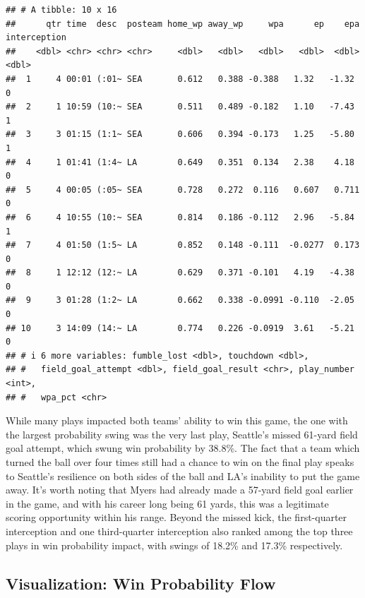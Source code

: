 \documentclass[
]{article}
\begin{document}
\begin{verbatim}
## # A tibble: 10 x 16
##      qtr time  desc  posteam home_wp away_wp     wpa      ep    epa interception
##    <dbl> <chr> <chr> <chr>     <dbl>   <dbl>   <dbl>   <dbl>  <dbl>        <dbl>
##  1     4 00:01 (:01~ SEA       0.612   0.388 -0.388   1.32   -1.32             0
##  2     1 10:59 (10:~ SEA       0.511   0.489 -0.182   1.10   -7.43             1
##  3     3 01:15 (1:1~ SEA       0.606   0.394 -0.173   1.25   -5.80             1
##  4     1 01:41 (1:4~ LA        0.649   0.351  0.134   2.38    4.18             0
##  5     4 00:05 (:05~ SEA       0.728   0.272  0.116   0.607   0.711            0
##  6     4 10:55 (10:~ SEA       0.814   0.186 -0.112   2.96   -5.84             1
##  7     4 01:50 (1:5~ LA        0.852   0.148 -0.111  -0.0277  0.173            0
##  8     1 12:12 (12:~ LA        0.629   0.371 -0.101   4.19   -4.38             0
##  9     3 01:28 (1:2~ LA        0.662   0.338 -0.0991 -0.110  -2.05             0
## 10     3 14:09 (14:~ LA        0.774   0.226 -0.0919  3.61   -5.21             0
## # i 6 more variables: fumble_lost <dbl>, touchdown <dbl>,
## #   field_goal_attempt <dbl>, field_goal_result <chr>, play_number <int>,
## #   wpa_pct <chr>
\end{verbatim}

While many plays impacted both teams' ability to win this game, the one
with the largest probability swing was the very last play, Seattle's
missed 61-yard field goal attempt, which swung win probability by
38.8\%. The fact that a team which turned the ball over four times still
had a chance to win on the final play speaks to Seattle's resilience on
both sides of the ball and LA's inability to put the game away. It's
worth noting that Myers had already made a 57-yard field goal earlier in
the game, and with his career long being 61 yards, this was a legitimate
scoring opportunity within his range. Beyond the missed kick, the
first-quarter interception and one third-quarter interception also
ranked among the top three plays in win probability impact, with swings
of 18.2\% and 17.3\% respectively.

\subsection{Visualization: Win Probability
Flow}\label{visualization-win-probability-flow}
\end{document}
